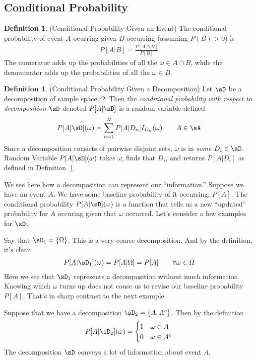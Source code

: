 \documentclass[12pt]{article}
\theoremstyle{plain}
\theoremstyle{definition}
\newtheorem{defn}[thm]{Definition}
\theoremstyle{remark}
\newcommand{\sumnN}{\sum^N_{n=1}}
\begin{document}
\clearpage
\subsection{Conditional Probability}

\begin{defn}(Conditional Probability Given an Event)
\label{defn:condprob}
The conditional probability of event $A$ ocurring given $B$ occurring
(assuming $P(B)>0$) is
\begin{align*}
  P[A|B] = \frac{P[A\cap B]}{P[B]}
\end{align*}
The numerator adds up the probabilities of all the $\omega \in A\cap B$,
while the denominator adds up the probabilities of all the
$\omega\in B$.
\end{defn}

\begin{defn}(Conditional Probability Given a Decomposition)
Let $\sD$ be a decomposition of sample space $\Omega$. Then
the \emph{conditional probability with respect to decomposition $\sD$}
denoted $P[A|\sD]$ is a random variable defined
\begin{align*}
  P[A|\sD](\omega) = \sumnN P[A|D_n] I_{D_n}(\omega)
  \qquad A \in \sA
\end{align*}
Since a decomposition consists of pairwise disjoint sets, $\omega$ is in
\emph{some} $D_i\in\sD$. Random Variable $P[A|\sD](\omega)$ takes
$\omega$, finds that $D_i$, and returns $P[A|D_i]$ as defined in
Definition~\ref{defn:condprob}.
\end{defn}

We see here how a decomposition can represent our ``information.''
Suppose we have an event $A$. We have some baseline probability of it
occurring, $P[A]$. The conditional probability $P[A|\sD](\omega)$ is a
function that tells us a new ``updated'' probability for $A$ occuring
given that $\omega$ occurred. Let's consider a few examples for $\sD$.

Say that $\sD_1=\{\Omega\}$. This is a very coarse decomposition.
And by the definition, it's clear
\begin{align*}
  P[A|\sD_1](\omega)=P[A|\Omega]=P[A]
  \qquad\forall\omega\in\Omega
\end{align*}
Here we see that $\sD_1$ represents a decomposition without much
information.  Knowing which $\omega$ turns up does not cause us to
revise our baseline probability $P[A]$. That's in sharp contrast to the
next example.

Suppose that we have a decomposition $\sD_2=\{A,A^c\}$. Then by the
definition
\begin{align*}
  P[A|\sD_2](\omega)
  =
  \begin{cases}
    1 & \omega \in A \\
    0 & \omega \in A^c \\
  \end{cases}
\end{align*}
The decomposition $\sD$ conveys a lot of information about event $A$.
\end{document}
